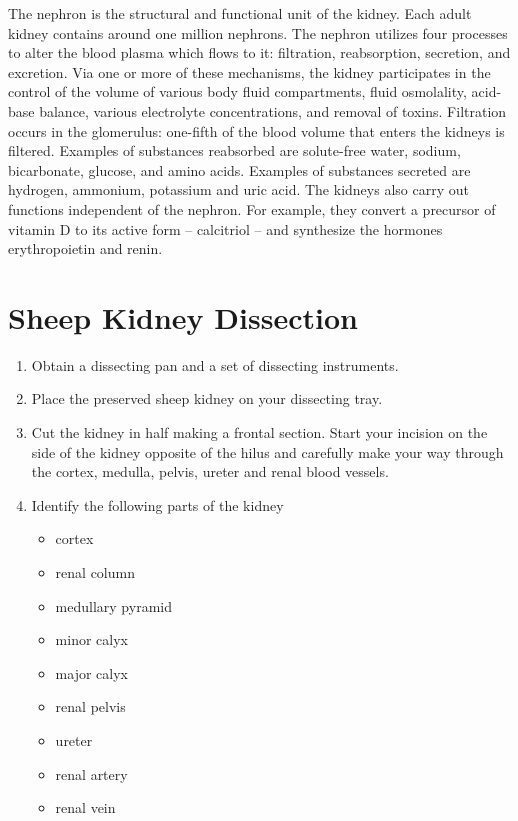 \documentclass[]{book}
\providecommand{\tightlist}{%
  \setlength{\itemsep}{0pt}\setlength{\parskip}{0pt}}
\theoremstyle{definition}
\theoremstyle{definition}
\theoremstyle{definition}
\theoremstyle{remark}
\begin{document}
The nephron is the structural and functional unit of the kidney. Each
adult kidney contains around one million nephrons. The nephron utilizes
four processes to alter the blood plasma which flows to it: filtration,
reabsorption, secretion, and excretion. Via one or more of these
mechanisms, the kidney participates in the control of the volume of
various body fluid compartments, fluid osmolality, acid-base balance,
various electrolyte concentrations, and removal of toxins. Filtration
occurs in the glomerulus: one-fifth of the blood volume that enters the
kidneys is filtered. Examples of substances reabsorbed are solute-free
water, sodium, bicarbonate, glucose, and amino acids. Examples of
substances secreted are hydrogen, ammonium, potassium and uric acid. The
kidneys also carry out functions independent of the nephron. For
example, they convert a precursor of vitamin D to its active form --
calcitriol -- and synthesize the hormones erythropoietin and renin.

\section{Sheep Kidney Dissection}\label{sheep-kidney-dissection}

\begin{enumerate}
\def\labelenumi{\arabic{enumi}.}
\tightlist
\item
  Obtain a dissecting pan and a set of dissecting instruments.
\item
  Place the preserved sheep kidney on your dissecting tray.
\item
  Cut the kidney in half making a frontal section. Start your incision
  on the side of the kidney opposite of the hilus and carefully make
  your way through the cortex, medulla, pelvis, ureter and renal blood
  vessels.
\item
  Identify the following parts of the kidney

  \begin{itemize}
  \tightlist
  \item
    cortex
  \item
    renal column
  \item
    medullary pyramid
  \item
    minor calyx
  \item
    major calyx
  \item
    renal pelvis
  \item
    ureter
  \item
    renal artery
  \item
    renal vein
  \end{itemize}
\end{enumerate}
\end{document}
